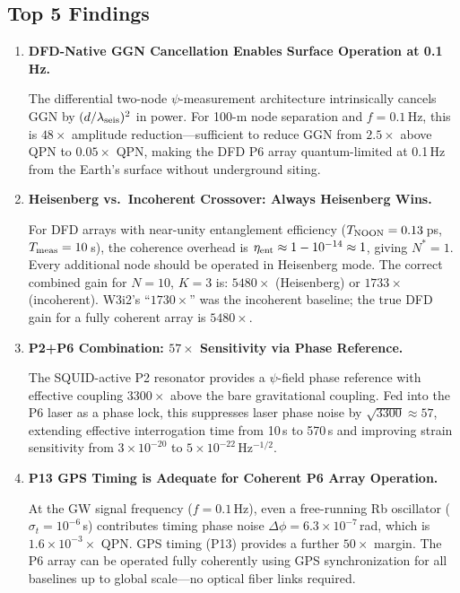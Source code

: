 \documentclass[11pt]{article}
\theoremstyle{definition}
\theoremstyle{remark}
\begin{document}
\subsection{Top 5 Findings}

\begin{enumerate}

\item \textbf{DFD-Native GGN Cancellation Enables Surface Operation at 0.1\,Hz.}

The differential two-node $\psi$-measurement architecture intrinsically
cancels GGN by $(d/\lambda_{\rm seis})^2$ in power. For 100-m node separation
and $f = 0.1$\,Hz, this is $48\times$ amplitude reduction---sufficient to
reduce GGN from $2.5\times$ above QPN to $0.05\times$ QPN, making the DFD
P6 array quantum-limited at 0.1\,Hz from the Earth's surface without
underground siting.

\item \textbf{Heisenberg vs.\ Incoherent Crossover: Always Heisenberg Wins.}

For DFD arrays with near-unity entanglement efficiency ($T_{\rm NOON}
= 0.13$\,ps, $T_{\rm meas} = 10$\,s), the coherence overhead is
$\eta_{\rm ent} \approx 1 - 10^{-14} \approx 1$, giving $N^* = 1$.
Every additional node should be operated in Heisenberg mode. The correct
combined gain for $N=10$, $K=3$ is: $5480\times$ (Heisenberg) or $1733\times$
(incoherent). W3i2's ``$1730\times$'' was the incoherent baseline; the true
DFD gain for a fully coherent array is $5480\times$.

\item \textbf{P2+P6 Combination: $57\times$ Sensitivity via Phase Reference.}

The SQUID-active P2 resonator provides a $\psi$-field phase reference with
effective coupling $3300\times$ above the bare gravitational coupling. Fed
into the P6 laser as a phase lock, this suppresses laser phase noise by
$\sqrt{3300} \approx 57$, extending effective interrogation time from 10\,s
to 570\,s and improving strain sensitivity from $3\times10^{-20}$ to
$5\times10^{-22}$\,Hz$^{-1/2}$.

\item \textbf{P13 GPS Timing is Adequate for Coherent P6 Array Operation.}

At the GW signal frequency ($f = 0.1$\,Hz), even a free-running Rb oscillator
($\sigma_t = 10^{-6}$\,s) contributes timing phase noise $\Delta\phi = 6.3
\times10^{-7}$\,rad, which is $1.6\times10^{-3}\times$ QPN. GPS timing
(P13) provides a further $50\times$ margin. The P6 array can be operated
fully coherently using GPS synchronization for all baselines up to global
scale---no optical fiber links required.


\end{enumerate}
\end{document}
